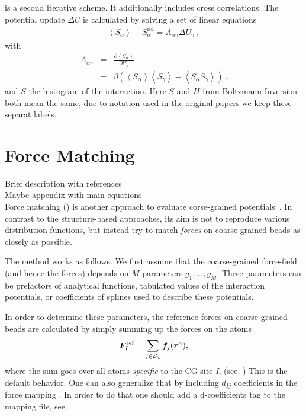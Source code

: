 \imc is a second iterative scheme. It additionally includes cross correlations. The potential update $\Delta U$ is calculated by solving a set of linear equations
\begin{align}
    \left<S_{\alpha}\right> - S_{\alpha}^{\text{ref}}= A_{\alpha \gamma} \Delta U_{\gamma}~,
  \label{eq:imc}
\end{align}
%
with
\begin{eqnarray}
  \label{eq:covariance}
  A_{\alpha \gamma} &=& \frac{\partial \left< S_{\alpha} \right> }{\partial U_{\gamma}}  \\
  \nonumber
  &=&
  \beta \left( \left<S_{\alpha} \right>\left<S_{\gamma} \right> - \left<S_{\alpha} S_{\gamma} \right>  \right)~.
  \nonumber
\end{eqnarray}
and $S$ the histogram of the interaction. Here $S$ and $H$ from Boltzmann Inversion both mean the same, due to notation used in the original papers we keep these separat labels.

\section{Force Matching}
\label{sec:fm}

\sasha

Brief description with references \\
Maybe appendix with main equations \\

Force matching (\fm) is another approach to evaluate corse-grained potentials~\cite{Ercolessi:1994,Izvekov:2005,Noid:2007}. In contrast to the structure-based approaches, its aim is not to reproduce various distribution functions, but instead try to match {\em forces} on coarse-grained beads as closely as possible.

The method works as follows. We first assume that the coarse-grained force-field (and hence the forces) depends on $M$ parameters $g_1,...,g_M $. These parameters can be prefactors of analytical functions, tabulated values of the interaction potentials, or coefficients of splines used to describe these potentials.

In order to determine these parameters, the reference forces on coarse-grained beads are calculated by simply summing up the forces on the atoms
\begin{equation}
  {\vec F}_I^\text{ref} = \sum_{j \in {\cal S_I}} {\vec f}_j({\vec r^n}),
  \label{eq:force_mapping}
\end{equation}
where the sum goes over all atoms {\it specific} to the CG site {\it I}, (see. )
This is the default behavior. One can also generalize that by including $d_{Ij}$ coefficients in the force mapping \cite{Noid:2008.1}. In order to do that one should add a d-coefficients tag to the mapping file, see. 


